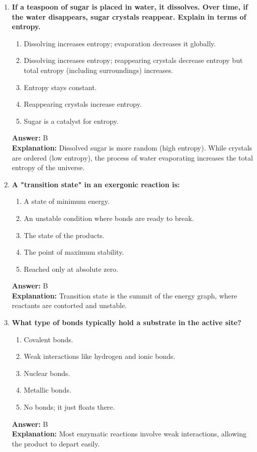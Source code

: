 \documentclass[11pt, a4paper]{article}
\begin{document}
\begin{enumerate}[leftmargin=*, label=\arabic*.]
\item \textbf{If a teaspoon of sugar is placed in water, it dissolves. Over time, if the water disappears, sugar crystals reappear. Explain in terms of entropy.}
\begin{enumerate}[label=\Alph*.]
    \item Dissolving increases entropy; evaporation decreases it globally.
    \item Dissolving increases entropy; reappearing crystals decrease entropy but total entropy (including surroundings) increases.
    \item Entropy stays constant.
    \item Reappearing crystals increase entropy.
    \item Sugar is a catalyst for entropy.
\end{enumerate}
\textbf{Answer:} B \\
\textbf{Explanation:} Dissolved sugar is more random (high entropy). While crystals are ordered (low entropy), the process of water evaporating increases the total entropy of the universe.

\item \textbf{A "transition state" in an exergonic reaction is:}
\begin{enumerate}[label=\Alph*.]
    \item A state of minimum energy.
    \item An unstable condition where bonds are ready to break.
    \item The state of the products.
    \item The point of maximum stability.
    \item Reached only at absolute zero.
\end{enumerate}
\textbf{Answer:} B \\
\textbf{Explanation:} Transition state is the summit of the energy graph, where reactants are contorted and unstable.

\item \textbf{What type of bonds typically hold a substrate in the active site?}
\begin{enumerate}[label=\Alph*.]
    \item Covalent bonds.
    \item Weak interactions like hydrogen and ionic bonds.
    \item Nuclear bonds.
    \item Metallic bonds.
    \item No bonds; it just floats there.
\end{enumerate}
\textbf{Answer:} B \\
\textbf{Explanation:} Most enzymatic reactions involve weak interactions, allowing the product to depart easily.


\end{enumerate}
\end{document}
